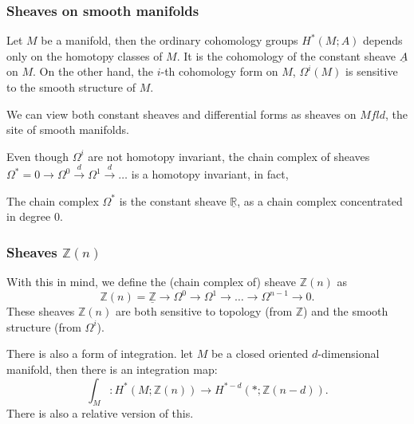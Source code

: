 \documentclass{beamer}
\newcommand{\Mfld}{Mfld}
\newcommand{\Z}{\mathbb Z}
\newcommand{\R}{\mathbb R}
\begin{document}
\begin{frame}
    \frametitle{Sheaves on smooth manifolds}
    Let $M$ be a manifold, then the ordinary cohomology groups  $H^*(M; A)$ depends 
    only on the homotopy classes of $M$. It is the cohomology of the constant sheave 
    $\underline{A}$ on $M$.
    On the other hand, the $i$-th cohomology form on $M$, $\Omega^i(M)$ is sensitive 
    to the smooth structure of $M$. \pause \vspace{5mm}
    
    We can view both constant sheaves and 
    differential forms as sheaves on $\Mfld$, the site of smooth manifolds. \pause 

    \vspace{5mm}
    Even though $\Omega^i$ are not homotopy invariant, the chain complex of sheaves 
    $\Omega^* = 0 \to \Omega^0 \xrightarrow{d} \Omega^1 \xrightarrow{d} \dots$ is a homotopy invariant,
    in fact,
    \begin{theorem}[de Rham]
        The chain complex $\Omega^*$ is the constant sheave $\underline{\R}$, as a chain complex concentrated in degree 0.
    \end{theorem}
\end{frame}

\begin{frame}
    \frametitle{Sheaves $\Z(n)$}
    With this in mind, we define the (chain complex of) sheave $\Z(n)$ as 
    \begin{equation}
        \Z(n) = \underline{\Z} \to \Omega^0 \to \Omega^1 \to \dots \to \Omega^{n-1} \to 0.
    \end{equation} \pause 
    These sheaves $\Z(n)$ are both sensitive to topology (from $\Z$) and the smooth 
    structure (from $\Omega^i$). \pause \vspace{5mm}

    There is also a form of integration.  let $M$ be a closed oriented $d$-dimensional 
    manifold, then there is an integration map:
    \begin{equation}
        \int_M: H^*(M; \Z(n)) \to H^{*-d}(*; \Z(n-d)).
    \end{equation}
    There is also a relative version of this.
\end{frame}
\end{document}
